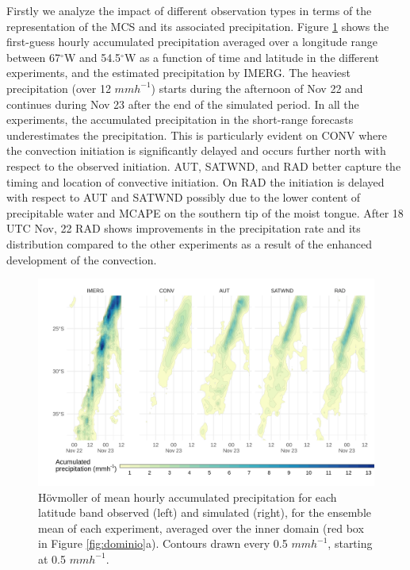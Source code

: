 \documentclass[final,5p,times,twocolumn,authoryear]{elsarticle} %
\begin{document}
Firstly we analyze the impact of different observation types in terms of the representation of the MCS and its associated precipitation. Figure \ref{fig:pp-hov} shows the first-guess hourly accumulated precipitation averaged over a longitude range between 67\(^{\circ}\)W and 54.5\(^{\circ}\)W as a function of time and latitude in the different experiments, and the estimated precipitation by IMERG. The heaviest precipitation (over 12 \(mmh^{-1}\)) starts during the afternoon of Nov 22 and continues during Nov 23 after the end of the simulated period. In all the experiments, the accumulated precipitation in the short-range forecasts underestimates the precipitation. This is particularly evident on CONV where the convection initiation is significantly delayed and occurs further north with respect to the observed initiation. AUT, SATWND, and RAD better capture the timing and location of convective initiation. On RAD the initiation is delayed with respect to AUT and SATWND possibly due to the lower content of precipitable water and MCAPE on the southern tip of the moist tongue. After 18 UTC Nov, 22 RAD shows improvements in the precipitation rate and its distribution compared to the other experiments as a result of the enhanced development of the convection.



\begin{figure}[h]
\includegraphics{../figures/pp-hov-1} \caption{Hövmoller of mean hourly accumulated precipitation for each latitude band observed (left) and simulated (right), for the ensemble mean of each experiment, averaged over the inner domain (red box in Figure \ref{fig:dominio}a). Contours drawn every 0.5 \(mmh^{-1}\), starting at 0.5 \(mmh^{-1}\).}\label{fig:pp-hov}
\end{figure}
\end{document}

